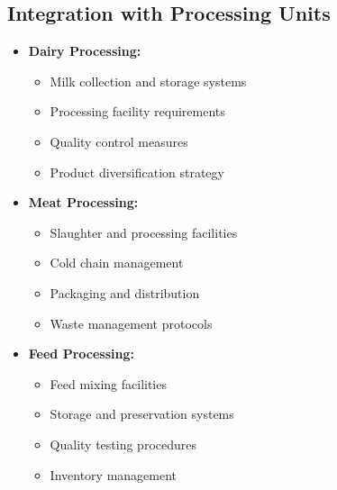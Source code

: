 \subsection{Integration with Processing Units}
\begin{itemize}
    \item \textbf{Dairy Processing:}
    \begin{itemize}
        \item Milk collection and storage systems
        \item Processing facility requirements
        \item Quality control measures
        \item Product diversification strategy
    \end{itemize}
    
    \item \textbf{Meat Processing:}
    \begin{itemize}
        \item Slaughter and processing facilities
        \item Cold chain management
        \item Packaging and distribution
        \item Waste management protocols
    \end{itemize}
    
    \item \textbf{Feed Processing:}
    \begin{itemize}
        \item Feed mixing facilities
        \item Storage and preservation systems
        \item Quality testing procedures
        \item Inventory management
    \end{itemize}
\end{itemize}

